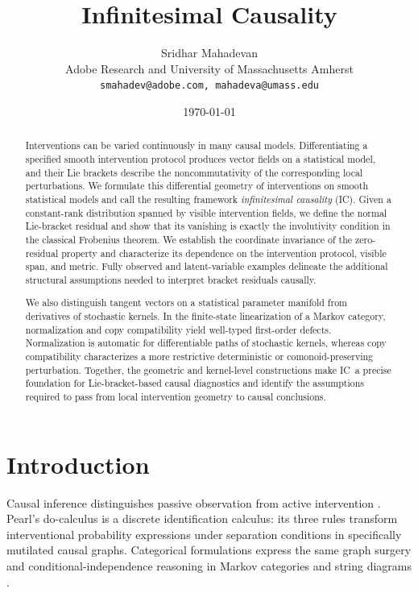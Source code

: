 \documentclass{article}
\title{\textbf{Infinitesimal Causality}}
\author{Sridhar Mahadevan\\
Adobe Research and University of Massachusetts Amherst\\
\texttt{smahadev@adobe.com, mahadeva@umass.edu}}
\date{\today}
\theoremstyle{plain}
\theoremstyle{definition}
\theoremstyle{remark}
\newcommand{\IC}{\textsc{IC}}
\begin{document}
\maketitle

\begin{abstract}
Interventions can be varied continuously in many causal models.  Differentiating
a specified smooth intervention protocol produces vector fields on a statistical
model, and their Lie brackets describe the noncommutativity of the corresponding
local perturbations.  We formulate this differential geometry of interventions
on smooth statistical models and call the resulting framework
\emph{infinitesimal causality} (\IC).  Given a constant-rank distribution
spanned by visible intervention fields, we define the normal Lie-bracket
residual and show that its vanishing is exactly the involutivity condition in
the classical Frobenius theorem.  We establish the coordinate invariance of the
zero-residual property and characterize its dependence on the intervention
protocol, visible span, and metric.  Fully observed and latent-variable
examples delineate the additional structural assumptions needed to interpret
bracket residuals causally.

We also distinguish tangent vectors on a statistical parameter manifold from
derivatives of stochastic kernels.  In the finite-state linearization of a
Markov category, normalization and copy compatibility yield well-typed
first-order defects.  Normalization is automatic for differentiable paths of
stochastic kernels, whereas copy compatibility characterizes a more restrictive
deterministic or comonoid-preserving perturbation.  Together, the geometric and
kernel-level constructions make \IC\ a precise foundation for
Lie-bracket-based causal diagnostics and identify the assumptions required to
pass from local intervention geometry to causal conclusions.
\end{abstract}


\section{Introduction}

Causal inference distinguishes passive observation from active intervention
\citep{pearl2009causality,rubin2005causal}.  Pearl's do-calculus is a discrete
identification calculus: its three rules transform interventional probability
expressions under separation conditions in specifically mutilated causal
graphs.  Categorical formulations express the same graph surgery and
conditional-independence reasoning in Markov categories and string diagrams
\citep{fritz2023dseparation,jacobs2018causal}.
\end{document}
